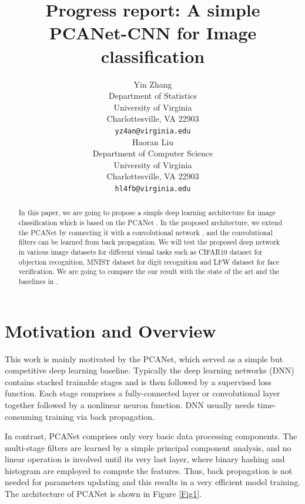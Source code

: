 \documentclass{article} %
\title{Progress report: A simple PCANet-CNN for Image classification}
\author{
Yin Zhang \\
Department of Statistics\\
University of Virginia\\
Charlottesville, VA 22903 \\
\texttt{yz4an@virginia.edu} \\
\And
Haoran Liu \\
Department of Computer Science \\
University of Virginia\\
Charlottesville, VA 22903  \\
\texttt{hl4fb@virginia.edu} \\
}
\begin{document}
\renewcommand{\b}[1] {\boldsymbol{#1}} 
\newcommand{\bb}[1] {\bar{\boldsymbol{#1}}}
\maketitle

\begin{abstract}

In this paper, we are going to propose a simple deep learning architecture for image classification which is based on the PCANet \cite{chan2015pcanet}. In the proposed architecture, we extend the PCANet by connecting it with a convolutional network \cite{krizhevsky2012imagenet}, and the convolutional filters can be learned from back propagation. We will test the proposed deep network in various image datasets for different visual tasks such as CIFAR10 dataset for objection recognition, MNIST dataset for digit recognition and LFW dataset for face verification. We are going to compare the our result with the state of the art and the baselines in \cite{chan2015pcanet}.
\end{abstract}

\section{Motivation and Overview}
This work is mainly motivated by the PCANet, which served as a simple but competitive deep learning baseline. Typically the deep learning networks (DNN) contains stacked trainable stages and is then followed by a supervised loss function. Each stage comprises a fully-connected layer or convolutional layer together followed by a nonlinear neuron function. DNN usually needs time-consuming training via back propagation.

In contrast, PCANet comprises only very basic data processing components. The multi-stage filters are learned by a simple principal component analysis, and no linear operation is involved until its very last layer, where binary hashing and histogram are employed to compute the features. Thus, back propagation is not needed for parameters updating and this results in a very efficient model training. The architecture of PCANet is shown in Figure \ref{Fig1}.
\end{document}
